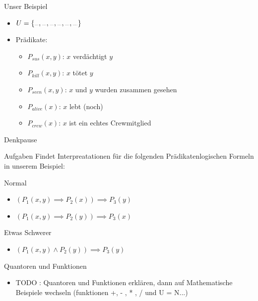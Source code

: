 \begin{frame}{Unser Beispiel}
    \begin{itemize}
        \item $U = \{\sus{red}, \sus{green}, \sus{blue}, \sus{white}, \sus{yellow}, \sus{magenta}\}$
        \item Prädikate:
        \begin{itemize}
            \item $P_{sus}(x,y)$: $x$ verdächtigt $y$
            \item $P_{kill}(x,y)$: $x$ tötet $y$
            \item $P_{seen}(x,y)$: $x$ und $y$ wurden zusammen gesehen
            \item $P_{alive}(x)$: $x$ lebt (noch)
            \item $P_{crew}(x)$: $x$ ist ein echtes Crewmitglied
        \end{itemize}
    \end{itemize}
\end{frame}

{
\begin{frame}[fragile]{Denkpause}
    \footnotesize
        \begin{alertblock}{Aufgaben}
            Findet Interpreatationen für die folgenden Prädikatenlogischen Formeln in unserem Beispiel:
        \end{alertblock}
        \begin{block}{Normal}
            \begin{itemize}
                \item $(P_1(x,y) \implies P_2(x)) \implies P_3(y)$
                \item $(P_1(x,y) \implies P_2(y)) \implies P_3(x)$
            \end{itemize}
        \end{block}
        \begin{block}{Etwas Schwerer}
            \begin{itemize}
                \item $(P_1(x,y) \wedge P_2(y)) \implies P_3(y)$
            \end{itemize}
        \end{block}
\end{frame}
}

\begin{frame}{Quantoren und Funktionen}
    \begin{itemize}
        \item TODO : Quantoren und Funktionen erklären, dann auf Mathematische Beispiele wechseln (funktionen +, - , * , / und U = N...)
    \end{itemize}
\end{frame}

